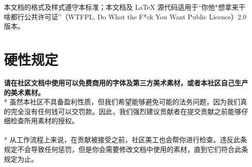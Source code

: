     本文档的格式及样式遵守本标准；本文档及 LaTeX 源代码适用于“你他*想拿来干啥都行公共许可证”（WTFPL, Do What the F*ck You Want Public Licence）2.0 版本。

    \section{硬性规定}
    
    \textbf{请在社区文档中使用可以免费商用的字体及第三方美术素材，或者本社区自己生产的美术素材。}\\*
    虽然本社区不具备盈利性质，但我们希望能够避免可能的法务问题，因为我们真的完全没有任何钱可以交罚款。因此，我们强烈建议贡献者在提交贡献之前能够仔细检查所用素材的授权。
    \\
    \\*
    从工作流程上来说，在贡献被接受之前，社区美工也会帮你进行检查。违反此条规定不会导致任何惩罚，但是你会需要修改文档中使用的素材，直到它们符合此条规定为止。


